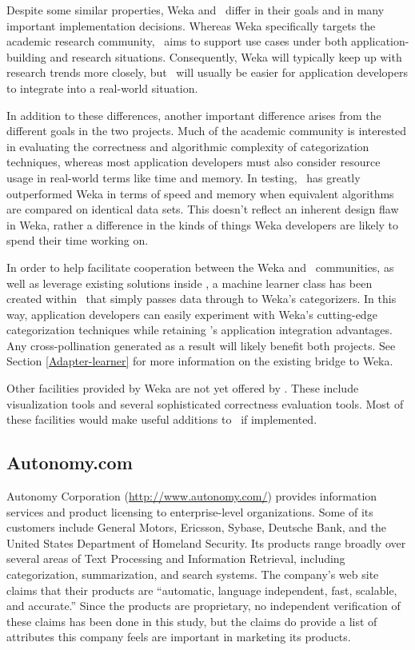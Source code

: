 Despite some similar properties, Weka and \aicat\ differ in
their goals and in many important implementation decisions.  Whereas
Weka specifically targets the academic research community,
\aicat\ aims to support use cases under both
application-building and research situations.
Consequently, Weka will typically keep up with research trends more
closely, but \aicat\ will usually be easier for application
developers to integrate into a real-world situation.

In addition to these differences, another important difference arises
from the different goals in the two projects.  Much of the academic
community is interested in evaluating the correctness and algorithmic
complexity of categorization techniques, whereas most application
developers must also consider resource usage in real-world terms like
time and memory.  In testing, \aicat\ has greatly outperformed
Weka in terms of speed and memory when equivalent algorithms are
compared on identical data sets.  This doesn't reflect an inherent
design flaw in Weka, rather a difference in the kinds of things Weka
developers are likely to spend their time working on.

In order to help facilitate cooperation between the Weka and
\aicat\ communities, as well as leverage existing solutions
inside \aicat, a machine learner class has been created
within \aicat\ that simply passes data through to Weka's
categorizers.  In this way, application developers can easily
experiment with Weka's cutting-edge categorization techniques while
retaining \aicat's application integration advantages.  Any
cross-pollination generated as a result will likely benefit both
projects.  See Section \ref{Adapter-learner} for more information on
the existing bridge to Weka.

Other facilities provided by Weka are not yet offered by
\aicat.  These include visualization tools and several
sophisticated correctness evaluation tools.  Most of these
facilities would make useful additions to \aicat\ if
implemented.

\subsection{Autonomy.com}

Autonomy Corporation (\url{http://www.autonomy.com/}) provides
information services and product licensing to enterprise-level
organizations.  Some of its customers include General Motors,
Ericsson, Sybase, Deutsche Bank, and the United States Department of
Homeland Security.  Its products range broadly over several areas of
Text Processing and Information Retrieval, including categorization,
summarization, and search systems.  The company's web site claims that
their products are ``automatic, language independent, fast, scalable,
and accurate.''  Since the products are proprietary, no independent
verification of these claims has been done in this study, but the
claims do provide a list of attributes this company feels are
important in marketing its products.

